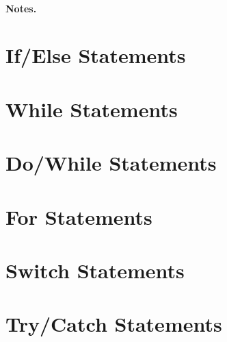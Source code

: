 \paragraph{Notes.} 


\section{If/Else Statements}
\section{While Statements}
\section{Do/While Statements}
\section{For Statements}
\section{Switch Statements}
\section{Try/Catch Statements}
